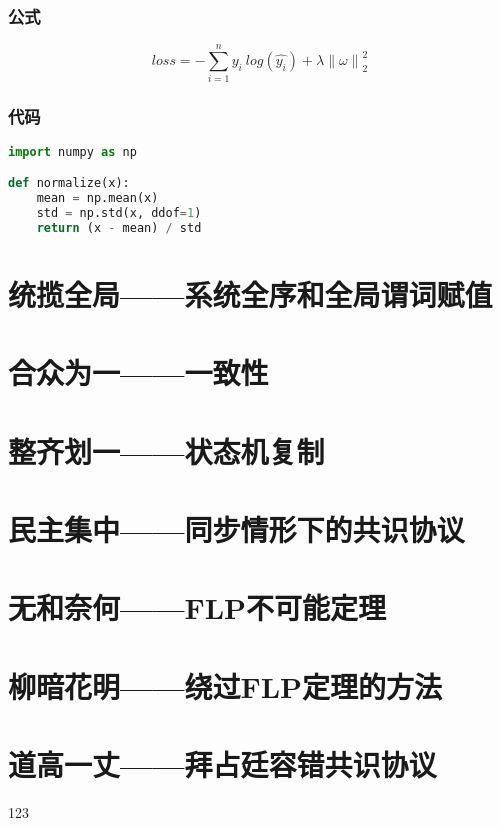 \documentclass[UTF8,AutoFakeBold=1,AutoFakeSlant,zihao=-4]{cucthesis}
\begin{document}
\subsubsection{公式}

\begin{equation}
    loss = - \sum_{i=1}^{n}{y_i\:log(\hat{y_i})} +     \label{eq:0}
    \lambda {\left\lVert\omega\right\rVert}_2^2
\end{equation}

\subsubsection{代码}

\begin{lstlisting}[language=Python]
import numpy as np

def normalize(x):
    mean = np.mean(x)
    std = np.std(x, ddof=1)
    return (x - mean) / std

\end{lstlisting}

\section{统揽全局——系统全序和全局谓词赋值}

\newpage

\section{合众为一——一致性}

\newpage

\section{整齐划一——状态机复制}

\newpage

\section{民主集中——同步情形下的共识协议}

\newpage

\section{无和奈何——FLP不可能定理}

\newpage

\section{柳暗花明——绕过FLP定理的方法}

\newpage

\section{道高一丈——拜占廷容错共识协议}


\begin{references}
    
\end{references}


123
\end{document}
